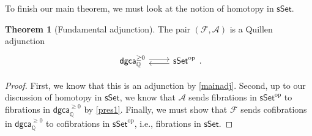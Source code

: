 \documentclass[10pt,letterpaper,cm]{nupset}
\theoremstyle{definition}
\theoremstyle{theorem}
\newtheorem{theorem}[defn]{Theorem}
\theoremstyle{remark}
\newcommand{\A}{\mathcal A}
\newcommand{\F}{\mathcal F}
\newcommand{\Q}{\mathbb Q}
\newcommand{\1}{\mathbb{1}}
\newcommand{\dgca}{\mathsf{dgca}}
\newcommand{\0}{\vec 0}
\DeclareMathOperator{\op}{op}
\begin{document}
To finish our main theorem, we must look at the notion of homotopy in $\mathsf{sSet}$.

\smallskip

\begin{theorem}[Fundamental adjunction]
The pair $\left(\F, \A\right)$ is a Quillen adjunction
\[
\begin{tikzcd}
	{\dgca_{\Q}^{\geq 0}} & {\mathsf{sSet}^{\op}}
	\arrow[shift left=1, from=1-1, to=1-2]
	\arrow[shift left=1, from=1-2, to=1-1]
\end{tikzcd} 
.\]
\end{theorem}
\begin{proof}
First, we know that this is an adjunction by \cref{mainadj}. Second, up to our discussion of homotopy in $\mathsf{sSet}$, we know that $\A$ sends fibrations in $\mathsf{sSet}^{\op}$ to fibrations in $\dgca_{\Q}^{\geq 0}$ by \cref{pres1}. Finally, we must show that $\F$ sends cofibrations in $\dgca_{\Q}^{\geq 0}$ to cofibrations in $\mathsf{sSet}^{\op}$, i.e., fibrations in $\mathsf{sSet}$.

\medskip


\end{proof}
\end{document}
